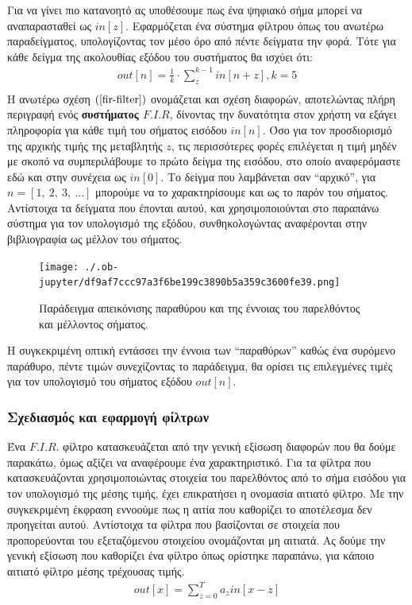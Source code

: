 \documentclass[breaklines=true, 12pt]{article}
\begin{document}
{{{Για να γίνει πιο κατανοητό ας υποθέσουμε πως ένα ψηφιακό σήμα μπορεί να αναπαρασταθεί
ως \(in[z]\). Εφαρμόζεται ένα σύστημα φίλτρου όπως του ανωτέρω παραδείγματος, υπολογίζοντας
τον μέσο όρο από πέντε δείγματα την φορά. Τότε για κάθε δείγμα της ακολουθίας εξόδου του
συστήματος θα ισχύει ότι:
\begin{equation}
\label{fir-filter}
\begin{align}
out[n] = \frac{1}{k} \cdot \sum_{z}^{{k-1}}in[n+z], k=5 \\
\end{align}
\end{equation}
Η ανωτέρω σχέση \((\ref{fir-filter})\) ονομάζεται και σχέση διαφορών, αποτελώντας πλήρη περιγραφή ενός \textbf{συστήματος
\(F.I.R\)}, δίνοντας την δυνατότητα στον χρήστη να εξάγει πληροφορία για κάθε τιμή του σήματος
εισόδου \(in[n]\). Όσο για τον προσδιορισμό της αρχικής τιμής της μεταβλητής \(z\), τις περισσότερες
φορές επιλέγεται η τιμή μηδέν με σκοπό να συμπεριλάβουμε το πρώτο δείγμα της εισόδου,
στο οποίο αναφερόμαστε εδώ και στην συνέχεια ως \(in[0]\). Το δείγμα που λαμβάνεται σαν “αρχικό”,
για \(n = [1,\ 2,\ 3,\ ...]\) μπορούμε να το χαρακτηρίσουμε και ως το παρόν του σήματος. Αντίστοιχα τα
δείγματα που έπονται αυτού, και χρησιμοποιούνται στο παραπάνω σύστημα για τον υπολογισμό
της εξόδου, συνθηκολογώντας αναφέρονται στην βιβλιογραφία ως μέλλον του σήματος.

\begin{figure}[H]
\centering
\texttt{[image: ./.ob-jupyter/df9af7ccc97a3f6be199c3890b5a359c3600fe39.png]}
\caption{\label{fig_explaining_future}Παράδειγμα απεικόνισης παραθύρου και της έννοιας του παρελθόντος και μέλλοντος σήματος.}
\end{figure}

Η συγκεκριμένη οπτική εντάσσει την έννοια των “παραθύρων” καθώς ένα συρόμενο παράθυρο, πέντε
τιμών συνεχίζοντας το παράδειγμα, θα ορίσει τις επιλεγμένες τιμές για τον υπολογισμό του
σήματος εξόδου \(out[n]\).
\subsubsection{Σχεδιασμός και εφαρμογή φίλτρων}
\label{sec:orgd8e3a00}
Ένα \(F.I.R.\) φίλτρο κατασκευάζεται από την γενική εξίσωση διαφορών που θα δούμε παρακάτω,
όμως αξίζει να αναφέρουμε ένα χαρακτηριστικό. Για τα φίλτρα που κατασκευάζονται
χρησιμοποιώντας στοιχεία του παρελθόντος από το σήμα εισόδου για τον υπολογισμό της μέσης τιμής,
έχει επικρατήσει η ονομασία αιτιατό φίλτρο. Με την συγκεκριμένη έκφραση εννοούμε πως
η αιτία που καθορίζει το αποτέλεσμα δεν προηγείται αυτού. Αντίστοιχα τα φίλτρα που
βασίζονται σε στοιχεία που προπορεύονται του εξεταζόμενου στοιχείου ονομάζονται μη
αιτιατά. Ας δούμε την γενική εξίσωση που καθορίζει ένα φίλτρο όπως ορίστηκε παραπάνω,
για κάποιο αιτιατό φίλτρο μέσης τρέχουσας τιμής.
\begin{equation}
\begin{align}
out[x] = \sum_{z=0}^{{T}} a_{z} in[x-z] \\
\end{align}
\end{equation}

}}}
\end{document}
